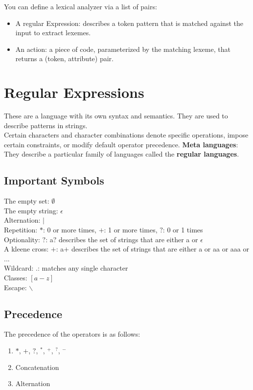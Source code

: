 You can define a lexical analyzer via a list of pairs:
\begin{itemize}
    \item A regular Expression: describes a token pattern that is matched against the input to extract lexemes.
    \item An action: a piece of code, parameterized by the matching lexeme, that returns a (token, attribute) pair.
\end{itemize}   

\section{Regular Expressions}
These are a language with its own syntax and semantics. They are used to describe patterns in strings.\\
Certain characters and character combinations denote specific operations, impose certain constraints, or modify default operator precedence.
\textbf{Meta languages}: They describe a particular family of languages called the \textbf{regular languages}.\\

\subsection{Important Symbols}
The empty set: $\emptyset$\\
The empty string: $\epsilon$\\
Alternation: $|$\\
Repetition: $*$: 0 or more times, $+$: 1 or more times, $?$: 0 or 1 times\\
Optionality: $?$: a$?$ describes the set of strings that are either a or $\epsilon$\\
A kleene cross: $+$: a$+$ describes the set of strings that are either a or aa or aaa or ...\\
Wildcard: $.$: matches any single character\\
Classes: $[a-z]$\\
Escape: $\backslash$\\

\subsection{Precedence}
The precedence of the operators is as follows:
\begin{enumerate}
    \item $*$, $+$, $?$, $^*$, $^+$, $^?$, $^-$
    \item Concatenation
    \item Alternation
\end{enumerate} 
\newpage

